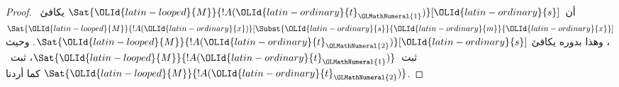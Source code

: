 \documentclass[../../../include/open-logic-section]{subfiles}
\begin{document}
\begin{proof}
 أن~$\Sat{\OLId{latin-looped}{M}}{!A(\OLId{latin-ordinary}{t}_\OLMathNumeral{1})}[\OLId{latin-ordinary}{s}]$
يكافئ~$\Sat{\OLId{latin-looped}{M}}{!A(\OLId{latin-ordinary}{x})}[\Subst{\OLId{latin-ordinary}{s}}{\OLId{latin-ordinary}{m}}{\OLId{latin-ordinary}{x}}]$، وهذا بدوره يكافئ
$\Sat{\OLId{latin-looped}{M}}{!A(\OLId{latin-ordinary}{t}_\OLMathNumeral{2})}[\OLId{latin-ordinary}{s}]$. وحيث ثبت~$\Sat{\OLId{latin-looped}{M}}{!A(\OLId{latin-ordinary}{t}_\OLMathNumeral{1})}$،
ثبت~$\Sat{\OLId{latin-looped}{M}}{!A(\OLId{latin-ordinary}{t}_\OLMathNumeral{2})}$ كما أردنا.
\end{proof}
\end{document}
